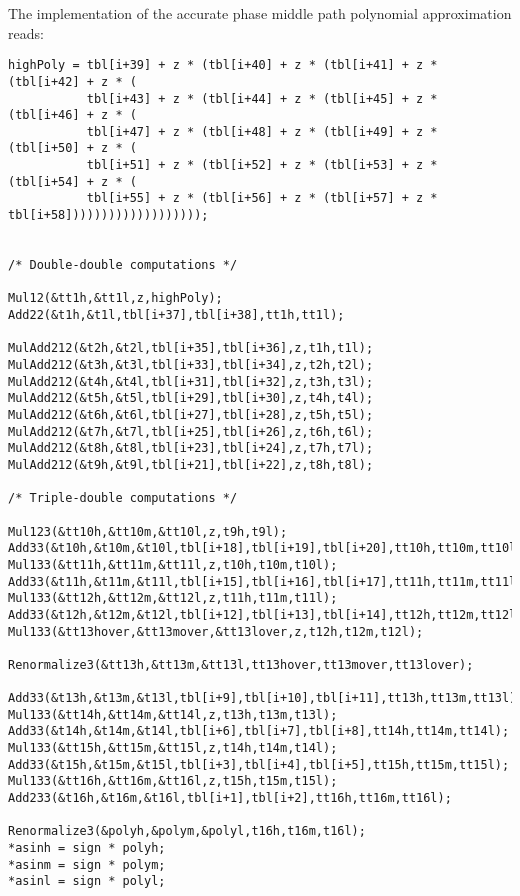 The implementation of the accurate phase middle path polynomial approximation reads:
\begin{lstlisting}[caption={Middle path accurate phase polynomial approximation},firstnumber=1]
highPoly = tbl[i+39] + z * (tbl[i+40] + z * (tbl[i+41] + z * (tbl[i+42] + z * (
           tbl[i+43] + z * (tbl[i+44] + z * (tbl[i+45] + z * (tbl[i+46] + z * (
           tbl[i+47] + z * (tbl[i+48] + z * (tbl[i+49] + z * (tbl[i+50] + z * (
           tbl[i+51] + z * (tbl[i+52] + z * (tbl[i+53] + z * (tbl[i+54] + z * (
           tbl[i+55] + z * (tbl[i+56] + z * (tbl[i+57] + z * tbl[i+58]))))))))))))))))));


/* Double-double computations */

Mul12(&tt1h,&tt1l,z,highPoly);
Add22(&t1h,&t1l,tbl[i+37],tbl[i+38],tt1h,tt1l);

MulAdd212(&t2h,&t2l,tbl[i+35],tbl[i+36],z,t1h,t1l);
MulAdd212(&t3h,&t3l,tbl[i+33],tbl[i+34],z,t2h,t2l);
MulAdd212(&t4h,&t4l,tbl[i+31],tbl[i+32],z,t3h,t3l);
MulAdd212(&t5h,&t5l,tbl[i+29],tbl[i+30],z,t4h,t4l);
MulAdd212(&t6h,&t6l,tbl[i+27],tbl[i+28],z,t5h,t5l);
MulAdd212(&t7h,&t7l,tbl[i+25],tbl[i+26],z,t6h,t6l);
MulAdd212(&t8h,&t8l,tbl[i+23],tbl[i+24],z,t7h,t7l);
MulAdd212(&t9h,&t9l,tbl[i+21],tbl[i+22],z,t8h,t8l);

/* Triple-double computations */

Mul123(&tt10h,&tt10m,&tt10l,z,t9h,t9l);                                    
Add33(&t10h,&t10m,&t10l,tbl[i+18],tbl[i+19],tbl[i+20],tt10h,tt10m,tt10l);  
Mul133(&tt11h,&tt11m,&tt11l,z,t10h,t10m,t10l);                             
Add33(&t11h,&t11m,&t11l,tbl[i+15],tbl[i+16],tbl[i+17],tt11h,tt11m,tt11l);  
Mul133(&tt12h,&tt12m,&tt12l,z,t11h,t11m,t11l);                             
Add33(&t12h,&t12m,&t12l,tbl[i+12],tbl[i+13],tbl[i+14],tt12h,tt12m,tt12l);  
Mul133(&tt13hover,&tt13mover,&tt13lover,z,t12h,t12m,t12l);                 

Renormalize3(&tt13h,&tt13m,&tt13l,tt13hover,tt13mover,tt13lover);          

Add33(&t13h,&t13m,&t13l,tbl[i+9],tbl[i+10],tbl[i+11],tt13h,tt13m,tt13l);   
Mul133(&tt14h,&tt14m,&tt14l,z,t13h,t13m,t13l);                             
Add33(&t14h,&t14m,&t14l,tbl[i+6],tbl[i+7],tbl[i+8],tt14h,tt14m,tt14l);     
Mul133(&tt15h,&tt15m,&tt15l,z,t14h,t14m,t14l);                             
Add33(&t15h,&t15m,&t15l,tbl[i+3],tbl[i+4],tbl[i+5],tt15h,tt15m,tt15l);     
Mul133(&tt16h,&tt16m,&tt16l,z,t15h,t15m,t15l);                             
Add233(&t16h,&t16m,&t16l,tbl[i+1],tbl[i+2],tt16h,tt16m,tt16l);             

Renormalize3(&polyh,&polym,&polyl,t16h,t16m,t16l);                         
*asinh = sign * polyh;
*asinm = sign * polym;
*asinl = sign * polyl;
\end{lstlisting} 

